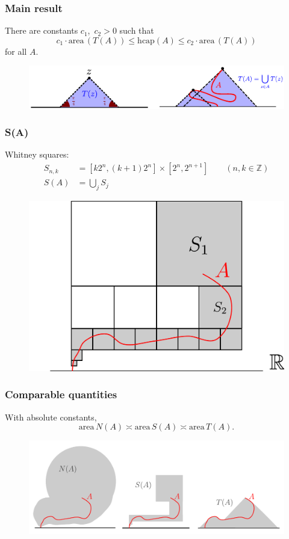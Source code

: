 \documentclass[xcolor=pdftex,dvipsnames,table]{beamer}
\newcommand{\bbZ}{\mathbb{Z}}
\newcommand{\area}{\text{area}\,}
\newcommand{\hcap}{\text{hcap}}
\theoremstyle{definition}
\begin{document}
\begin{frame}
  \frametitle{Main result}
  \begin{theorem}
    There are constants $c_1$,~$c_2 > 0$ such that
    \[
        c_1 \cdot \area(T(A)) \leq \hcap(A) \leq c_2 \cdot \area(T(A))
    \]
    for all $A$.
  \end{theorem}
  \vspace{-0.2in}
  \begin{figure}
    \includegraphics[scale=1.3]{T(A).pdf}
  \end{figure}
\end{frame}

\begin{frame}
  \frametitle{S(A)}
  Whitney squares: 
  \[
      \begin{aligned}
          S_{n,k} &= [k 2^n, (k+1) 2^n] \times [2^n, 2^{n+1}] \qquad (n, k \in \bbZ)\\
          S(A) &= \bigcup_{j} S_j
      \end{aligned}
  \]
  \begin{figure}
    \includegraphics[scale=0.4]{S(A).pdf}
  \end{figure}
\end{frame}


\begin{frame}
  \frametitle{Comparable quantities}
  With absolute constants,
  \[
    \area N(A) \asymp \area S(A) \asymp \area T(A).
  \]
  \begin{figure}
    \includegraphics[scale=0.6]{geomQuantity.pdf}
  \end{figure}
\end{frame}
\end{document}
